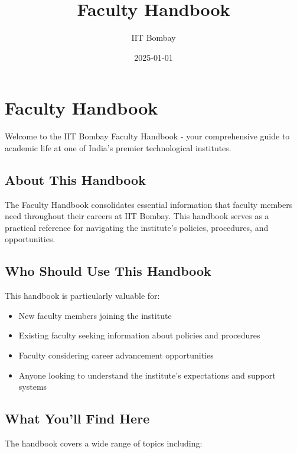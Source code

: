 \documentclass[
  10pt,
  a5paper,
  10pt,
  openany]{amsbook}
\title{Faculty Handbook}
\author{IIT Bombay}
\date{2025-01-01}
\providecommand{\tightlist}{%
  \setlength{\itemsep}{0pt}\setlength{\parskip}{0pt}}
\renewcommand*\contentsname{Table of contents}
\newcommand\contentsname{Table of contents}
\begin{document}
\maketitle

\renewcommand*\contentsname{Table of contents}
{
\hypersetup{linkcolor=blue}
\setcounter{tocdepth}{1}
\tableofcontents
}

\chapter{Faculty Handbook}\label{faculty-handbook}

Welcome to the IIT Bombay Faculty Handbook - your comprehensive guide to
academic life at one of India's premier technological institutes.

\section{About This Handbook}\label{about-this-handbook}

The Faculty Handbook consolidates essential information that faculty
members need throughout their careers at IIT Bombay. This handbook
serves as a practical reference for navigating the institute's policies,
procedures, and opportunities.

\section{Who Should Use This
Handbook}\label{who-should-use-this-handbook}

This handbook is particularly valuable for:

\begin{itemize}
\tightlist
\item
  New faculty members joining the institute
\item
  Existing faculty seeking information about policies and procedures
\item
  Faculty considering career advancement opportunities
\item
  Anyone looking to understand the institute's expectations and support
  systems
\end{itemize}

\section{What You'll Find Here}\label{what-youll-find-here}

The handbook covers a wide range of topics including:
\end{document}
